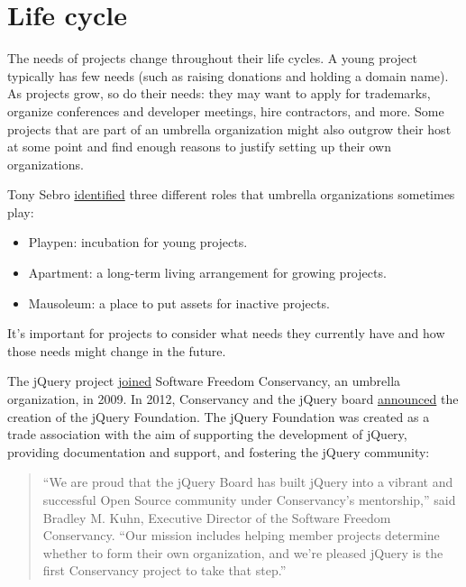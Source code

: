


\chapter{Life cycle}

The needs of projects change throughout their life cycles.  A young project typically has few needs (such as raising donations and holding a domain name).  As projects grow, so do their needs: they may want to apply for trademarks, organize conferences and developer meetings, hire contractors, and more.  Some projects that are part of an umbrella organization might also outgrow their host at some point and find enough reasons to justify setting up their own organizations.

Tony Sebro \href{https://lwn.net/Articles/548542/}{identified} three different roles that umbrella organizations sometimes play:

\begin{itemize}

\item Playpen: incubation for young projects.

\item Apartment: a long-term living arrangement for growing projects.

\item Mausoleum: a place to put assets for inactive projects.

\end{itemize}

It's important for projects to consider what needs they currently have and how those needs might change in the future.

\begin{kaobox}[frametitle=jQuery and the jQuery Foundation]

The jQuery project \href{https://sfconservancy.org/news/2009/nov/30/jQuery-joins/}{joined} Software Freedom Conservancy, an umbrella organization, in 2009.  In 2012, Conservancy and the jQuery board \href{https://sfconservancy.org/news/2012/mar/06/jQuery-Foundation/}{announced} the creation of the jQuery Foundation.  The jQuery Foundation was created as a trade association with the aim of supporting the development of jQuery, providing documentation and support, and fostering the jQuery community:

\begin{quote}

``We are proud that the jQuery Board has built jQuery into a vibrant and successful Open Source community under Conservancy's mentorship,'' said Bradley M. Kuhn, Executive Director of the Software Freedom Conservancy. ``Our mission includes helping member projects determine whether to form their own organization, and we're pleased jQuery is the first Conservancy project to take that step.''

\end{quote}

\end{kaobox}

